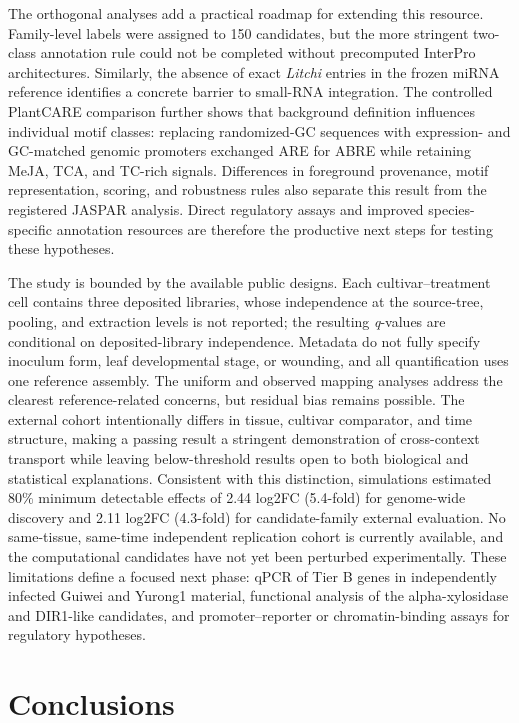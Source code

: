 \documentclass[referee,pdflatex,sn-basic,Numbered]{sn-jnl}
\newcommand{\q}{\textit{q}}
\begin{document}
The orthogonal analyses add a practical roadmap for extending this resource. Family-level labels were assigned to 150 candidates, but the more stringent two-class annotation rule could not be completed without precomputed InterPro architectures. Similarly, the absence of exact \textit{Litchi} entries in the frozen miRNA reference identifies a concrete barrier to small-RNA integration. The controlled PlantCARE comparison further shows that background definition influences individual motif classes: replacing randomized-GC sequences with expression- and GC-matched genomic promoters exchanged ARE for ABRE while retaining MeJA, TCA, and TC-rich signals. Differences in foreground provenance, motif representation, scoring, and robustness rules also separate this result from the registered JASPAR analysis. Direct regulatory assays and improved species-specific annotation resources are therefore the productive next steps for testing these hypotheses.

The study is bounded by the available public designs. Each cultivar--treatment cell contains three deposited libraries, whose independence at the source-tree, pooling, and extraction levels is not reported; the resulting \q-values are conditional on deposited-library independence. Metadata do not fully specify inoculum form, leaf developmental stage, or wounding, and all quantification uses one reference assembly. The uniform and observed mapping analyses address the clearest reference-related concerns, but residual bias remains possible. The external cohort intentionally differs in tissue, cultivar comparator, and time structure, making a passing result a stringent demonstration of cross-context transport while leaving below-threshold results open to both biological and statistical explanations. Consistent with this distinction, simulations estimated 80\% minimum detectable effects of 2.44 log2FC (5.4-fold) for genome-wide discovery and 2.11 log2FC (4.3-fold) for candidate-family external evaluation. No same-tissue, same-time independent replication cohort is currently available, and the computational candidates have not yet been perturbed experimentally. These limitations define a focused next phase: qPCR of Tier B genes in independently infected Guiwei and Yurong1 material, functional analysis of the alpha-xylosidase and DIR1-like candidates, and promoter--reporter or chromatin-binding assays for regulatory hypotheses.

\section{Conclusions}\label{sec:conclusions}
\end{document}
